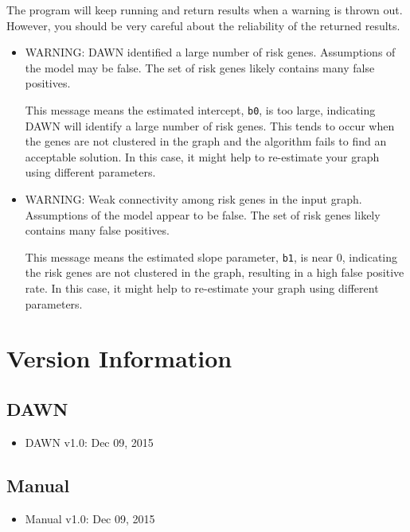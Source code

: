 \documentclass{article}
\begin{document}
	The program will keep running and return results when a warning is thrown out. However, you should be very careful about the reliability of the returned results.
	\begin{itemize}
		\item WARNING: DAWN identified a large number of risk genes. 
		Assumptions of the model may be false.  The set of risk genes likely contains many false positives.
		
		This message means the estimated intercept, \texttt{b0}, is too large, indicating DAWN will identify a large number of risk genes.  This tends to occur when the genes are not clustered in the graph and the algorithm fails to find an acceptable solution.  In this case, it might help to re-estimate your graph using different parameters.
		
		\item WARNING: Weak connectivity among risk genes in the input graph. Assumptions of the model appear to be false. 	The set of risk genes likely contains many false positives.
		
		This message means the estimated slope parameter, \texttt{b1}, is near 0, indicating the risk genes are not clustered in the graph, resulting in a high false positive rate. In this case, it might help to re-estimate your graph  using different parameters.
	\end{itemize}

\section{Version Information}
	\subsection{DAWN}
	\begin{itemize}
		\item DAWN v1.0: Dec 09, 2015
	\end{itemize}
	\subsection{Manual}
	\begin{itemize}
		\item Manual v1.0: Dec 09, 2015
	\end{itemize}

		
\end{document}
